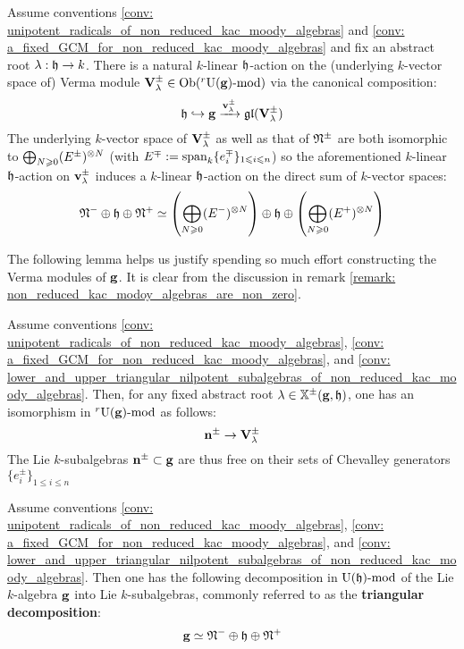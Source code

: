             \begin{remark} \label{remark: cartan_action_on_verma_modules_of_non_reduced_kac_moody_algebras}
                Assume conventions \ref{conv: unipotent_radicals_of_non_reduced_kac_moody_algebras} and \ref{conv: a_fixed_GCM_for_non_reduced_kac_moody_algebras} and fix an abstract root $\lambda: \mathfrak{h} \to k$. There is a natural $k$-linear $\mathfrak{h}$-action on the (underlying $k$-vector space of) Verma module $\mathbf{V}_{\lambda}^{\pm} \in \mathrm{Ob}({}^r\mathrm{U}(\mathbf{g})\text{-}\mathrm{mod})$ via the canonical composition:
                    $$\mathfrak{h} \hookrightarrow \mathbf{g} \xrightarrow[]{\mathbf{v}_{\lambda}^{\pm}} \mathfrak{gl}(\mathbf{V}_{\lambda}^{\pm})$$
                The underlying $k$-vector space of $\mathbf{V}_{\lambda}^{\pm}$ as well as that of $\mathfrak{N}^{\pm}$ are both isomorphic to $\bigoplus_{N \geq 0} (E^{\pm})^{\tensor N}$ (with $E^{\mp} := \operatorname{span}_k \{e_i^{\mp}\}_{1 \leqslant i \leqslant n}$) so the aforementioned $k$-linear $\mathfrak{h}$-action on $\mathbf{v}_{\lambda}^{\pm}$ induces a $k$-linear $\mathfrak{h}$-action on the direct sum of $k$-vector spaces:
                    $$\frakN^- \oplus \h \oplus \frakN^+ \cong \left( \bigoplus_{N \geq 0} (E^-)^{\tensor N} \right) \oplus \h \oplus \left( \bigoplus_{N \geq 0} (E^+)^{\tensor N} \right)$$
            \end{remark}
            The following lemma helps us justify spending so much effort constructing the Verma modules of $\mathbf{g}$. It is clear from the discussion in remark \ref{remark: non_reduced_kac_modoy_algebras_are_non_zero}.
            \begin{lemma} \label{lemma: lower_and_upper_triangular_nilpotent_subalgebras_of_non_reduced_kac_moody_algebras_are_free}
                Assume conventions \ref{conv: unipotent_radicals_of_non_reduced_kac_moody_algebras}, \ref{conv: a_fixed_GCM_for_non_reduced_kac_moody_algebras}, and \ref{conv: lower_and_upper_triangular_nilpotent_subalgebras_of_non_reduced_kac_moody_algebras}. Then, for any fixed abstract root $\lambda \in \mathbb{X}^{\pm}(\mathbf{g}, \mathfrak{h})$, one has an isomorphism in ${}^r\mathrm{U}(\mathbf{g})\text{-}\mathrm{mod}$ as follows:
                    $$\mathbf{n}^{\pm} \to \mathbf{V}_{\lambda}^{\pm}$$
                The Lie $k$-subalgebras $\mathbf{n}^{\pm} \subset \mathbf{g}$ are thus free on their sets of Chevalley generators $\{e_i^{\pm}\}_{1 \leq i \leq n}$
            \end{lemma}
            \begin{proposition} \label{prop: triangular_decomposition_of_kac_moody_algebras}
                \cite[Theorem 1.2(a)]{kac_infinite_dimensional_lie_algebras} Assume conventions \ref{conv: unipotent_radicals_of_non_reduced_kac_moody_algebras}, \ref{conv: a_fixed_GCM_for_non_reduced_kac_moody_algebras}, and \ref{conv: lower_and_upper_triangular_nilpotent_subalgebras_of_non_reduced_kac_moody_algebras}. Then one has the following decomposition in $\mathrm{U}(\mathfrak{h})\text{-}\mathrm{mod}$ of the Lie $k$-algebra $\mathbf{g}$ into Lie $k$-subalgebras, commonly referred to as the \textbf{triangular decomposition}:
                    $$\mathbf{g} \simeq \mathfrak{N}^- \oplus \mathfrak{h} \oplus \mathfrak{N}^+$$
            \end{proposition}
